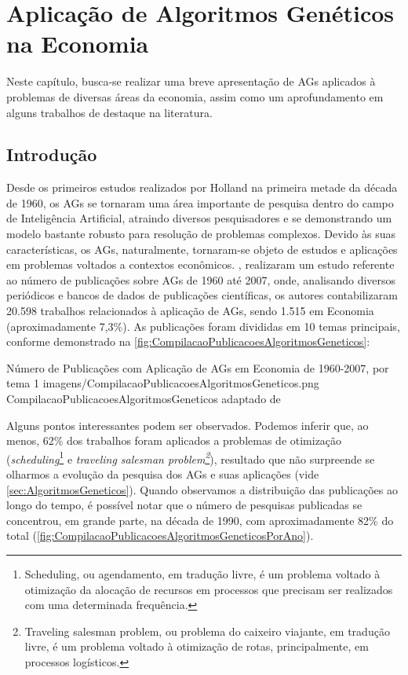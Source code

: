\chapter{Aplicação de Algoritmos Genéticos na Economia}

Neste capítulo, busca-se realizar uma breve apresentação de AGs aplicados à problemas de diversas áreas da economia, assim como um aprofundamento em alguns trabalhos de destaque na literatura.

\section{Introdução}

Desde os primeiros estudos realizados por Holland na primeira metade da década de 1960, os AGs se tornaram uma área importante de pesquisa dentro do campo de Inteligência Artificial, atraindo diversos pesquisadores e se demonstrando um modelo bastante robusto para resolução de problemas complexos. Devido às suas características, os AGs, naturalmente, tornaram-se objeto de estudos e aplicações em problemas voltados a contextos econômicos. , realizaram um estudo referente ao número de publicações sobre AGs de 1960 até 2007, onde, analisando diversos periódicos e bancos de dados de publicações científicas, os autores contabilizaram 20.598 trabalhos relacionados à aplicação de AGs, sendo 1.515 em Economia (aproximadamente 7,3\%). As publicações foram divididas em 10 temas principais, conforme demonstrado na \autoref{fig:CompilacaoPublicacoesAlgoritmosGeneticos}:

\figura
	{Número de Publicações com Aplicação de AGs em Economia de 1960-2007, por tema}
	{1}
	{imagens/CompilacaoPublicacoesAlgoritmosGeneticos.png}
	{CompilacaoPublicacoesAlgoritmosGeneticos}
	{adaptado de }

Alguns pontos interessantes podem ser observados. Podemos inferir que, ao menos, 62\% dos trabalhos foram aplicados a problemas de otimização (\textit{scheduling}\footnote{Scheduling, ou agendamento, em tradução livre, é um problema voltado à otimização da alocação de recursos em processos que precisam ser realizados com uma determinada frequência.} e \textit{traveling salesman problem\footnote{Traveling salesman problem, ou problema do caixeiro viajante, em tradução livre, é um problema voltado à otimização de rotas, principalmente, em processos logísticos.}}), resultado que não surpreende se olharmos a evolução da pesquisa dos AGs e suas aplicações (vide \autoref{sec:AlgoritmosGeneticos}). Quando observamos a distribuição das publicações ao longo do tempo, é possível notar que o número de pesquisas publicadas se concentrou, em grande parte, na década de 1990, com aproximadamente 82\% do total (\autoref{fig:CompilacaoPublicacoesAlgoritmosGeneticosPorAno}).

